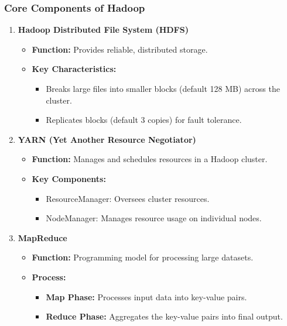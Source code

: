 \documentclass[aspectratio=169]{beamer}
\begin{document}
\begin{frame}[fragile]
    \frametitle{Core Components of Hadoop}
    \begin{enumerate}
        \item \textbf{Hadoop Distributed File System (HDFS)}
            \begin{itemize}
                \item \textbf{Function:} Provides reliable, distributed storage.
                \item \textbf{Key Characteristics:}
                    \begin{itemize}
                        \item Breaks large files into smaller blocks (default 128 MB) across the cluster.
                        \item Replicates blocks (default 3 copies) for fault tolerance.
                    \end{itemize}
            \end{itemize}
        
        \item \textbf{YARN (Yet Another Resource Negotiator)}
            \begin{itemize}
                \item \textbf{Function:} Manages and schedules resources in a Hadoop cluster.
                \item \textbf{Key Components:}
                    \begin{itemize}
                        \item ResourceManager: Oversees cluster resources.
                        \item NodeManager: Manages resource usage on individual nodes.
                    \end{itemize}
            \end{itemize}
        
        \item \textbf{MapReduce}
            \begin{itemize}
                \item \textbf{Function:} Programming model for processing large datasets.
                \item \textbf{Process:}
                    \begin{itemize}
                        \item \textbf{Map Phase:} Processes input data into key-value pairs.
                        \item \textbf{Reduce Phase:} Aggregates the key-value pairs into final output.
                    \end{itemize}
            \end{itemize}
    \end{enumerate}
\end{frame}
\end{document}
